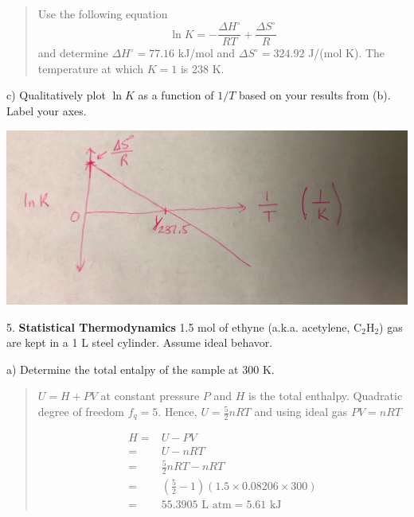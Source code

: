 \documentclass[11pt]{article}
\newcommand{\brian}[1]{
  {\begin{quote}
      \color{blue} #1
  \end{quote}}
}
\begin{document}
\brian{Use the following equation
  \begin{equation*}
      \ln K = -\frac{\Delta H^\circ}{RT} + \frac{\Delta S^\circ}{R}
  \end{equation*}
  and determine $\Delta H^\circ = 77.16$ kJ/mol and $\Delta S^\circ=324.92$ J/(mol K). The
  temperature at which $K=1$ is 238 K.
}

c) Qualitatively plot $\ln K$ as a function of $1/T$ based on your results from (b). {\color{blue}
  Label your axes.}

\begin{center}
  \includegraphics[scale=0.1]{vant_hoff.jpeg}
\end{center}

%

5. \textbf{Statistical Thermodynamics} 1.5 mol of ethyne (a.k.a. acetylene, C$_2$H$_2$) gas
are kept in a 1 L steel cylinder. Assume ideal behavor.

a) Determine the total entalpy of the sample at 300 K.

\brian{$U = H + PV$ at constant pressure $P$ and $H$ is the total enthalpy. Quadratic degree
  of freedom $f_q = 5 $. Hence, $U = \frac{5}{2}nRT$ and using ideal gas $PV = nRT$

  \begin{align*}
    H = & U - PV \\
    = & U - nRT \\
    = & \frac{5}{2}nRT - nRT \\
    = & (\frac{5}{2} - 1)(1.5\times 0.08206 \times 300) \\
    = &  \text{55.3905 L atm} = 5.61 \text{ kJ}
  \end{align*}  
}
\end{document}
